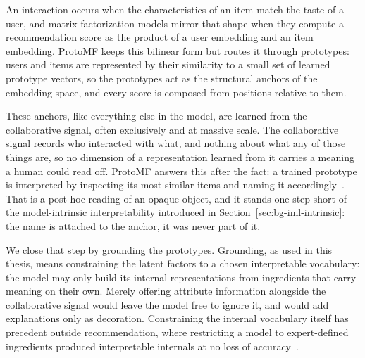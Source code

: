 


An interaction occurs when the characteristics of an item match the taste of
a user, and matrix factorization models mirror that shape when they compute a
recommendation score as the product of a user embedding and an item
embedding. ProtoMF keeps this bilinear form but routes it through prototypes:
users and items are represented by their similarity to a small set of learned
prototype vectors, so the prototypes act as the structural anchors of the
embedding space, and every score is composed from positions relative to them.

These anchors, like everything else in the model, are learned from the
collaborative signal, often exclusively and at massive scale. The
collaborative signal records who interacted with what, and nothing about what
any of those things are, so no dimension of a representation learned from it
carries a meaning a human could read off. ProtoMF answers this after the
fact: a trained prototype is interpreted by inspecting its most similar items
and naming it accordingly~\cite{melchiorre2022protomf}. %
That is a post-hoc reading of an opaque object, and it stands one step short
of the model-intrinsic interpretability introduced in
Section~\ref{sec:bg-iml-intrinsic}: the name is attached to the anchor, it
was never part of it.

We close that step by grounding the prototypes. Grounding, as used in this
thesis, means constraining the latent factors to a chosen interpretable
vocabulary: the model may only build its internal representations from
ingredients that carry meaning on their own. Merely offering attribute
information alongside the collaborative signal would leave the model free to
ignore it, and would add explanations only as decoration. Constraining the
internal vocabulary itself has precedent outside recommendation, where
restricting a model to expert-defined ingredients produced interpretable
internals at no loss of accuracy~\cite{niknazarXXXXsleep}. %

